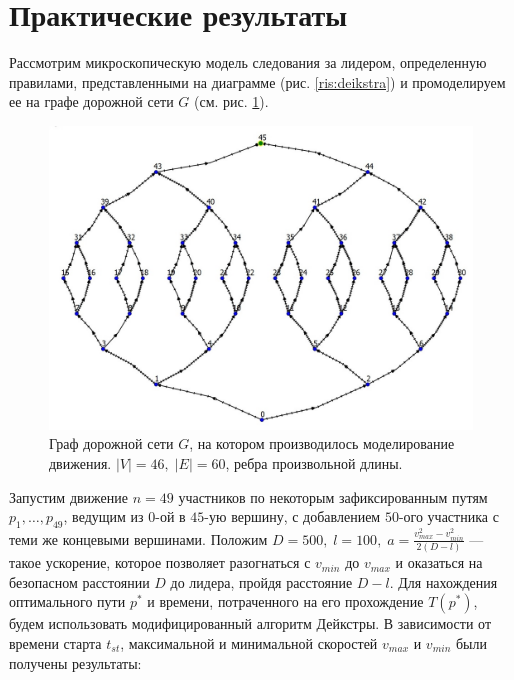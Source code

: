 \documentclass[12pt, a4paper]{article}
\begin{document}
\newpage
\section*{Практические результаты}
Рассмотрим микроскопическую модель следования за лидером, определенную правилами, представленными на диаграмме (рис. \ref{ris:deikstra}) и промоделируем ее на графе дорожной сети $G$ (см. рис. \ref{ris:Graph}).

\begin{figure}[H]
	\centering
	\includegraphics[scale=0.25]{Graph_N.jpg}
	\caption{Граф дорожной сети $G$, на котором производилось моделирование движения. $|V| = 46, \; |E| = 60$, ребра произвольной длины.}
	\label{ris:Graph}
\end{figure}

Запустим движение $n = 49$ участников по некоторым зафиксированным путям $p_1, \dots, p_{49}$, ведущим из $0$-ой в $45$-ую вершину, с добавлением $50$-ого участника с теми же концевыми вершинами. Положим $D = 500, \; l = 100, \; a = \frac{v^2_{max}-v^2_{min}}{2(D-l)}$ --- такое ускорение, которое позволяет разогнаться с $v_{min}$ до $v_{max}$ и оказаться на безопасном расстоянии $D$ до лидера, пройдя расстояние $D-l$. Для нахождения оптимального пути $p^*$ и времени, потраченного на его прохождение $T(p^*)$, будем использовать модифицированный алгоритм Дейкстры. В зависимости от времени старта $t_{st}$, максимальной и минимальной скоростей $v_{max}$ и $v_{min}$ были получены результаты:
\end{document}
